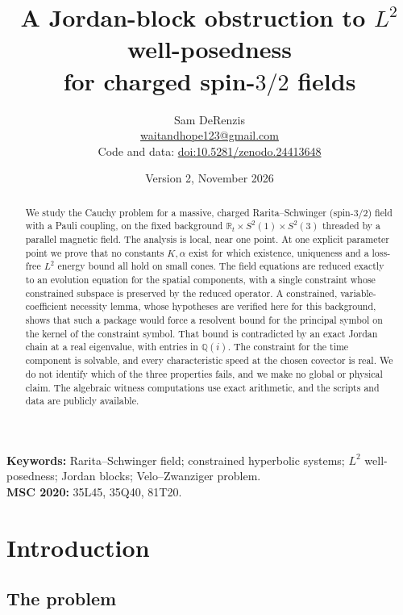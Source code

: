 \documentclass[11pt]{article}
\title{A Jordan-block obstruction to $L^2$ well-posedness\\ for charged spin-$3/2$ fields}
\author{Sam DeRenzis\\[2pt]
  \small \href{mailto:waitandhope123@gmail.com}{waitandhope123@gmail.com}\\
  \small Code and data: \href{https://doi.org/10.5281/zenodo.24413648}{doi:10.5281/zenodo.24413648}}
\date{\small Version 2, November 2026}
\theoremstyle{plain}
\theoremstyle{definition}
\theoremstyle{remark}
\newcommand{\R}{\mathbb{R}}
\newcommand{\Q}{\mathbb{Q}}
\begin{document}
\maketitle

\begin{abstract}
We study the Cauchy problem for a massive, charged Rarita--Schwinger (spin-$3/2$) field with a Pauli coupling, on the fixed background $\R_t\times S^2(1)\times S^2(3)$ threaded by a parallel magnetic field. The analysis is local, near one point. At one explicit parameter point we prove that no constants $K,\alpha$ exist for which existence, uniqueness and a loss-free $L^2$ energy bound all hold on small cones. The field equations are reduced exactly to an evolution equation for the spatial components, with a single constraint whose constrained subspace is preserved by the reduced operator. A constrained, variable-coefficient necessity lemma, whose hypotheses are verified here for this background, shows that such a package would force a resolvent bound for the principal symbol on the kernel of the constraint symbol. That bound is contradicted by an exact Jordan chain at a real eigenvalue, with entries in $\Q(i)$. The constraint for the time component is solvable, and every characteristic speed at the chosen covector is real. We do not identify which of the three properties fails, and we make no global or physical claim. The algebraic witness computations use exact arithmetic, and the scripts and data are publicly available.
\end{abstract}

\noindent\textbf{Keywords:} Rarita--Schwinger field; constrained hyperbolic systems; $L^2$ well-posedness; Jordan blocks; Velo--Zwanziger problem.\\
\textbf{MSC 2020:} 35L45, 35Q40, 81T20.

\section{Introduction}\label{sec:intro}

\subsection{The problem}\label{sec:intro-problem}
\end{document}
